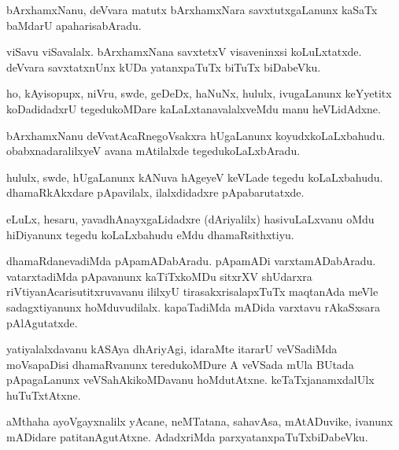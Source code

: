 \documentclass{article}
\begin{document}
\begin{mn}
bArxhamxNanu, deVvara matutx bArxhamxNara savxtutxgaLanunx kaSaTx baMdarU apaharisabAradu.
\end{mn}

\begin{mn}
viSavu viSavalalx. bArxhamxNana savxtetxV visaveninxsi koLuLxtatxde. deVvara savxtatxnUnx kUDa 
yatanxpaTuTx biTuTx biDabeVku.
\end{mn}

\begin{mn}
ho, kAyisopupx, niVru, swde, geDeDx, haNuNx, hululx, ivugaLanunx keYyetitx koDadidadxrU 
tegedukoMDare kaLaLxtanavalalxveMdu manu heVLidAdxne.
\end{mn}

\begin{mn}
bArxhamxNanu deVvatAcaRnegoVsakxra hUgaLanunx koyudxkoLaLxbahudu. obabxnadaralilxyeV avana 
mAtilalxde tegedukoLaLxbAradu.
\end{mn}

\begin{mn}
hululx, swde, hUgaLanunx kANuva hAgeyeV keVLade tegedu koLaLxbahudu. dhamaRkAkxdare pApavilalx, 
ilalxdidadxre pApabarutatxde.
\end{mn}

\begin{mn}
eLuLx, hesaru, yavadhAnayxgaLidadxre (dAriyalilx) hasivuLaLxvanu oMdu hiDiyanunx  tegedu 
koLaLxbahudu eMdu dhamaRsithxtiyu.
\end{mn}

\begin{mn}
dhamaRdanevadiMda pApamADabAradu. pApamADi varxtamADabAradu. vatarxtadiMda pApavanunx kaTiTxkoMDu 
sitxrXV shUdarxra riVtiyanAcarisutitxruvavanu ililxyU tirasakxrisalapxTuTx maqtanAda meVle 
sadagxtiyanunx hoMduvudilalx. kapaTadiMda mADida varxtavu rAkaSxsara pAlAgutatxde.
\end{mn}

\begin{mn}
yatiyalalxdavanu kASAya dhAriyAgi, idaraMte itararU veVSadiMda moVsapaDisi dhamaRvanunx 
teredukoMDure A veVSada mUla BUtada pApagaLanunx veVSahAkikoMDavanu hoMdutAtxne. 
keTaTxjanamxdalUlx huTuTxtAtxne.
\end{mn}

\begin{mn}
aMthaha ayoVgayxnalilx yAcane, neMTatana, sahavAsa, mAtADuvike, ivanunx mADidare 
patitanAgutAtxne. AdadxriMda parxyatanxpaTuTxbiDabeVku.
\end{mn}
\end{document}
